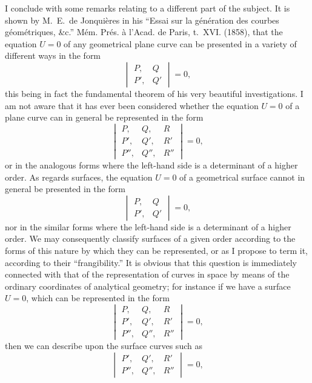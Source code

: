 \documentclass[11pt,a4paper]{book}
\begin{document}
I conclude with some remarks relating to a different part of the subject. It is shown by M.~E.~de Jonqui\`{e}res in his ``Essai sur la g\'{e}n\'{e}ration des courbes g\'{e}om\'{e}triques, \&c.'' M\'{e}m. Pr\'{e}s. \`{a} l'Acad. de Paris, t.~XVI. (1858), that the equation $U = 0$ of any geometrical plane curve can be presented in a variety of different ways in the form
\[
\begin{vmatrix}
P, & Q \\
P', & Q'
\end{vmatrix} = 0,
\]
this being in fact the fundamental theorem of his very beautiful investigations. I am not aware that it has ever been considered whether the equation $U = 0$ of a plane curve can in general be represented in the form
\[
\begin{vmatrix}
P, & Q, & R \\
P', & Q', & R' \\
P'', & Q'', & R''
\end{vmatrix} = 0,
\]
or in the analogous forms where the left-hand side is a determinant of a higher order. As regards surfaces, the equation $U = 0$ of a geometrical surface cannot in general be presented in the form
\[
\begin{vmatrix}
P, & Q \\
P', & Q'
\end{vmatrix} = 0,
\]
nor in the similar forms where the left-hand side is a determinant of a higher order. We may consequently classify surfaces of a given order according to the forms of this nature by which they can be represented, or as I propose to term it, according to their ``frangibility.'' It is obvious that this question is immediately connected with that of the representation of curves in space by means of the ordinary coordinates of analytical geometry; for instance if we have a surface $U = 0$, which can be represented in the form
\[
\begin{vmatrix}
P, & Q, & R \\
P', & Q', & R' \\
P'', & Q'', & R''
\end{vmatrix} = 0,
\]
then we can describe upon the surface curves such as
\[
\begin{vmatrix}
P', & Q', & R' \\
P'', & Q'', & R''
\end{vmatrix} = 0,
\]
\end{document}
